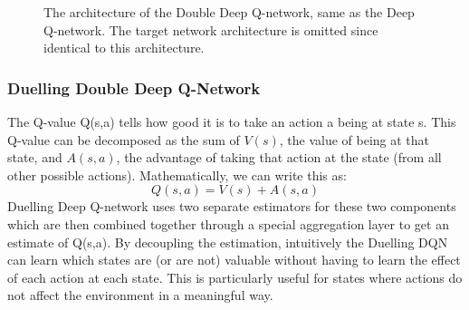 \documentclass[14pt]{extarticle}
\def\sp{\vspace{5pt}}
\begin{document}
\begin{flushleft}
\begin{figure}[H]
\begin{center}
	    		\caption{The architecture of the Double Deep Q-network, same as the Deep Q-network. The target network architecture is omitted since identical to this architecture.}
\end{center}
\end{figure}

	\subsubsection{Duelling Double Deep Q-Network}
	\sp
	The Q-value Q(s,a) tells how good it is to take an action a being at state s. This Q-value can be decomposed as the sum of $V(s)$, the value of being at that state, and $A(s,a)$, the advantage of taking that action at the state (from all other possible actions). Mathematically, we can write this as:
	\[ Q(s,a) = V(s) + A(s,a)\]
Duelling Deep Q-network uses two separate estimators for these two components which are then combined together through a special aggregation layer to get an estimate of Q(s,a). By decoupling the estimation, intuitively the Duelling DQN can learn which states are (or are not) valuable without having to learn the effect of each action at each state. This is particularly useful for states where actions do not affect the environment in a meaningful way. \cite{DDQN2} %
	

\end{flushleft}
\end{document}

